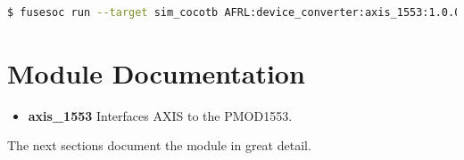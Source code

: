 \begin{lstlisting}[language=bash]
  $ fusesoc run --target sim_cocotb AFRL:device_converter:axis_1553:1.0.0
\end{lstlisting}


\newpage

\section{Module Documentation} \label{Module Documentation}

\begin{itemize}
\item \textbf{axis\_1553} Interfaces AXIS to the PMOD1553.\\
\end{itemize}
The next sections document the module in great detail.

